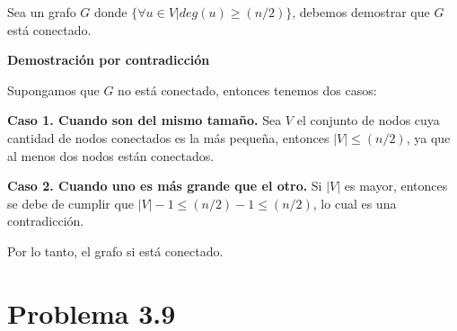 \documentclass{article}
\begin{document}
Sea un grafo $G$ donde $\{\forall u \in V | deg(u) \geq (n/2) \}$, debemos demostrar
que $G$ está conectado.

\textbf{Demostración por contradicción}

Supongamos que $G$ no está conectado, entonces tenemos dos casos:

\textbf{Caso 1. Cuando son del mismo tamaño.}
Sea $V$ el conjunto de nodos cuya cantidad de nodos conectados es la más
pequeña, entonces $| V | \leq (n/2)$, ya que al menos dos nodos están conectados.

\textbf{Caso 2. Cuando uno es más grande que el otro.}
Si $|V|$ es mayor, entonces se debe de cumplir que $|V|-1 \leq (n/2)-1 \leq
(n/2)$, lo cual es una contradicción.

Por lo tanto, el grafo si está conectado.


\section*{Problema 3.9}

% 
% 
\end{document}
